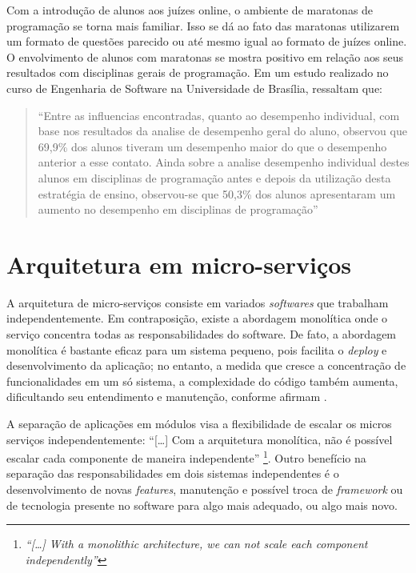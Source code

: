 Com a introdução de alunos aos juízes online, o ambiente de maratonas de programação se torna mais familiar. Isso se dá ao fato das maratonas utilizarem um formato de questões parecido ou até mesmo igual ao formato de juízes online. O envolvimento de alunos com maratonas se mostra positivo em relação aos seus resultados com disciplinas gerais de programação. Em um estudo realizado no curso de Engenharia de Software na Universidade de Brasília,  ressaltam que:

\begin{quote}
    ``Entre as influencias encontradas, quanto ao desempenho individual, com base nos resultados da analise de desempenho geral do aluno, observou que 69,9\% dos alunos tiveram um desempenho maior do que o desempenho anterior a esse contato. Ainda sobre a analise desempenho individual destes alunos em disciplinas de programação antes e depois da utilização desta estratégia de ensino, observou-se que 50,3\% dos alunos apresentaram um aumento no desempenho em disciplinas de programação'' \cite[p.218]{pereiraetal}
\end{quote} 

\section{Arquitetura em micro-serviços}
\label{sec:microServicos}

A arquitetura de micro-serviços consiste em variados \textit{softwares} que trabalham independentemente. Em contraposição, existe a abordagem monolítica onde o serviço concentra todas as responsabilidades do software. De fato, a abordagem monolítica é bastante eficaz para um sistema pequeno, pois facilita o \textit{deploy} e desenvolvimento da aplicação; no entanto, a medida que cresce a concentração de funcionalidades em um só sistema, a complexidade do código também aumenta, dificultando seu entendimento e manutenção, conforme afirmam .

A separação de aplicações em módulos visa a flexibilidade de escalar os micros serviços independentemente: ``[\dots] Com a arquitetura monolítica, não é possível escalar cada componente de maneira independente'' \cite[p.24, tradução nossa]{dmitry2014micro}\footnote{\textit{``[\dots] With a monolithic architecture, we can not scale each component independently''}}. Outro benefício na separação das responsabilidades em dois sistemas independentes é o desenvolvimento de novas \textit{features}, manutenção e possível troca de \textit{framework} ou de tecnologia presente no software para algo mais adequado, ou algo mais novo. 


